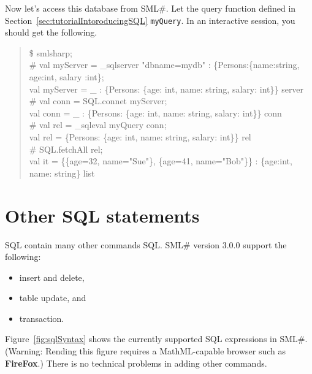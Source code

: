 \documentclass{jbook}
\newif\ifjp
\newcommand{\txt}[2]{#2}
\newcommand{\smlsharp}{SML\#}
\newcommand{\version}{3.0.0}
\newenvironment{program}{\begin{quote}\begin{tt}}%
                        {\end{tt}\end{quote}}
\begin{document}
	Now let's access this database from \smlsharp{}.
	Let the query function defined in Section~\ref{sec:tutorialIntoroducingSQL}
{\tt myQuery}.
	In an interactive session, you should get the following.
\begin{program}
\$ smlsharp;\\
\# val myServer = \_sqlserver "dbname=mydb" : \{Persons:\{name:string, age:int, salary :int\};\\
val myServer = \_ : \{Persons: \{age: int, name: string, salary: int\}\} server\\
\# val conn = SQL.connet myServer;\\
val conn = \_ : \{Persons: \{age: int, name: string, salary: int\}\} conn\\
\# val rel = \_sqleval myQuery conn;\\
val rel = \{Persons: \{age: int, name: string, salary: int\}\} rel\\
\# SQL.fetchAll rel;\\
val it = \{\{age=32, name="Sue"\}, \{age=41, name="Bob"\}\} : \{age:int, name: string\} list
\end{program}
\fi%

\section{\txt{その他のSQL文}{Other SQL statements}}
\label{sec:tutorialOtherSQLElement}

\ifjp%
	SQL言語は，データベースからデータを取り出す{\tt select}文以外に，
様々な機能が提供されています．
	\smlsharp{}の\version{}版では，以下の機能をサポートしています．
\begin{itemize}
\item タプルの追加と削除
\item テーブルの更新
\item トランザクションの実行
\end{itemize}
	図\ref{fig:sqlSyntax}に現在のSQLの構文の概要を示します．
	(注意: この図の表示には{\bf FireFox}などのMathMLを表示可能なブラウザが必要です．)
	これ以外のSQL言語の機能の追加も技術的には問題はありません．
	次版以降でより完全なSQL言語の統合をして行く予定です．
\else%
	SQL contain many other commands SQL.
	\smlsharp{} version \version{} support the following:
\begin{itemize}
\item insert and delete,
\item table update, and
\item transaction.
\end{itemize}
	Figure~\ref{fig:sqlSyntax} shows the currently supported SQL expressions in
\smlsharp{}.
	(Warning: Rending this figure requires a MathML-capable browser such as {\bf FireFox}.)
	There is no technical problems in adding other commands.
\fi%
\end{document}
